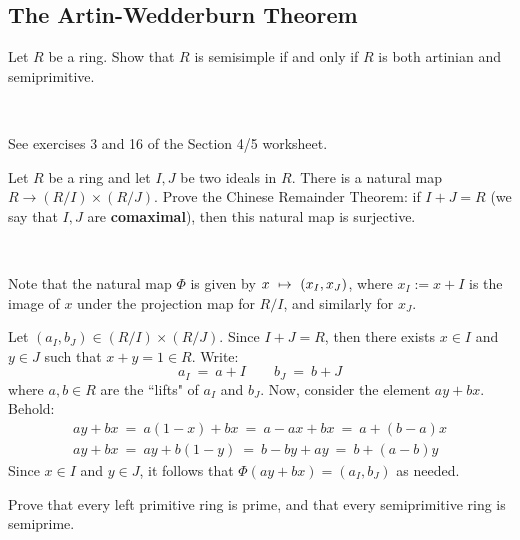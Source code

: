 \subsection{The Artin-Wedderburn Theorem}

\begin{exr}
	Let $R$ be a ring. Show that $R$ is semisimple if and only if
	$R$ is both artinian and semiprimitive.
\end{exr} \

\begin{pf}
	See exercises 3 and 16 of the Section 4/5 worksheet.
\end{pf}


\nq
\begin{exr}[title=Chinese Remainder Theorem]
	Let $R$ be a ring and let $I,J$ be two ideals in $R$.
	There is a natural map $R\rightarrow (R/I)\times (R/J)$.
	Prove the Chinese Remainder Theorem: if $I+J=R$ (we say that $I,J$ are \textbf{comaximal}),
	then this natural map is surjective.
\end{exr} \

\begin{pf}
	Note that the natural map $\Phi$ is given by $x \ \mapsto \ (x_{I},x_{J})$,
	where $x_{I}:=x+I$ is the image of $x$ under the projection map for $R/I$,
	and similarly for $x_{J}$.

	Let $(a_{I},b_{J})\in (R/I)\times(R/J)$.
	Since $I+J=R$, then there exists $x\in I$ and $y\in J$ such that $x+y=1\in R$.
	Write:
	\begin{equation*}
		a_{I} \ = \ a+I \qquad b_{J} \ = \ b+J
	\end{equation*}
	where $a,b\in R$ are the ``lifts" of $a_{I}$ and $b_{J}$.
	Now, consider the element $ay+bx$. Behold:
	\begin{gather*}
		ay+bx \ = \ a(1-x)+bx \ = \ a-ax+bx \ = \ a+(b-a)x \\
		ay+bx \ = \ ay+b(1-y) \ = \ b-by+ay \ = \ b+(a-b)y
	\end{gather*}
	Since $x\in I$ and $y\in J$, it follows that $\Phi(ay+bx)=(a_{I},b_{J})$ as needed.
\end{pf}


\nq
\begin{exr}[title=secretly part of 11.6 and 10.17(?)]
	Prove that every left primitive ring is prime,
	and that every semiprimitive ring is semiprime.
\end{exr} \

